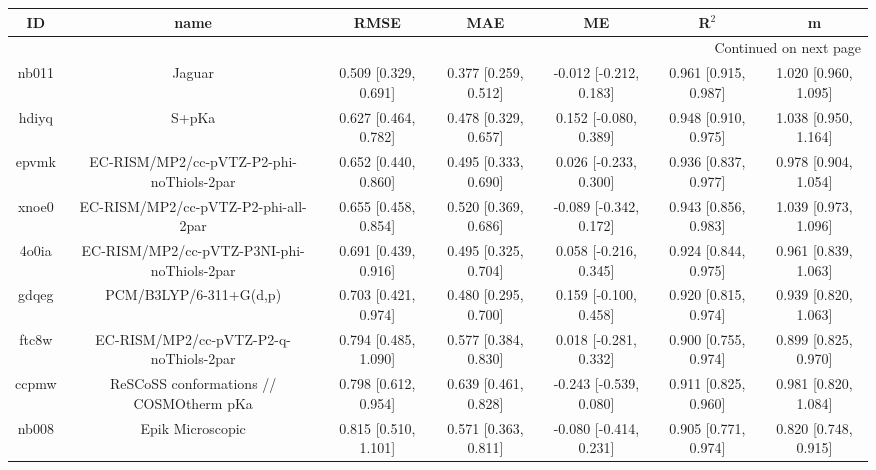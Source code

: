 \documentclass{article}
\begin{document}
\begin{center}
\begin{longtable}{|ccccccc|}
\toprule
    ID &                                               name &                  RMSE &                   MAE &                       ME &                 R$^2$ &                      m \\
\midrule
\endhead
\midrule
\multicolumn{7}{r}{{Continued on next page}} \\
\midrule
\endfoot

\bottomrule
\endlastfoot
 nb011 &                                             Jaguar &  0.509 [0.329, 0.691] &  0.377 [0.259, 0.512] &   -0.012 [-0.212, 0.183] &  0.961 [0.915, 0.987] &   1.020 [0.960, 1.095] \\
 hdiyq &                                              S+pKa &  0.627 [0.464, 0.782] &  0.478 [0.329, 0.657] &    0.152 [-0.080, 0.389] &  0.948 [0.910, 0.975] &   1.038 [0.950, 1.164] \\
 epvmk &           EC-RISM/MP2/cc-pVTZ-P2-phi-noThiols-2par &  0.652 [0.440, 0.860] &  0.495 [0.333, 0.690] &    0.026 [-0.233, 0.300] &  0.936 [0.837, 0.977] &   0.978 [0.904, 1.054] \\
 xnoe0 &                EC-RISM/MP2/cc-pVTZ-P2-phi-all-2par &  0.655 [0.458, 0.854] &  0.520 [0.369, 0.686] &   -0.089 [-0.342, 0.172] &  0.943 [0.856, 0.983] &   1.039 [0.973, 1.096] \\
 4o0ia &         EC-RISM/MP2/cc-pVTZ-P3NI-phi-noThiols-2par &  0.691 [0.439, 0.916] &  0.495 [0.325, 0.704] &    0.058 [-0.216, 0.345] &  0.924 [0.844, 0.975] &   0.961 [0.839, 1.063] \\
 gdqeg &                             PCM/B3LYP/6-311+G(d,p) &  0.703 [0.421, 0.974] &  0.480 [0.295, 0.700] &    0.159 [-0.100, 0.458] &  0.920 [0.815, 0.974] &   0.939 [0.820, 1.063] \\
 ftc8w &             EC-RISM/MP2/cc-pVTZ-P2-q-noThiols-2par &  0.794 [0.485, 1.090] &  0.577 [0.384, 0.830] &    0.018 [-0.281, 0.332] &  0.900 [0.755, 0.974] &   0.899 [0.825, 0.970] \\
 ccpmw &            ReSCoSS conformations // COSMOtherm pKa &  0.798 [0.612, 0.954] &  0.639 [0.461, 0.828] &   -0.243 [-0.539, 0.080] &  0.911 [0.825, 0.960] &   0.981 [0.820, 1.084] \\
 nb008 &                                   Epik Microscopic &  0.815 [0.510, 1.101] &  0.571 [0.363, 0.811] &   -0.080 [-0.414, 0.231] &  0.905 [0.771, 0.974] &   0.820 [0.748, 0.915] \\

\end{longtable}
\end{center}
\end{document}
